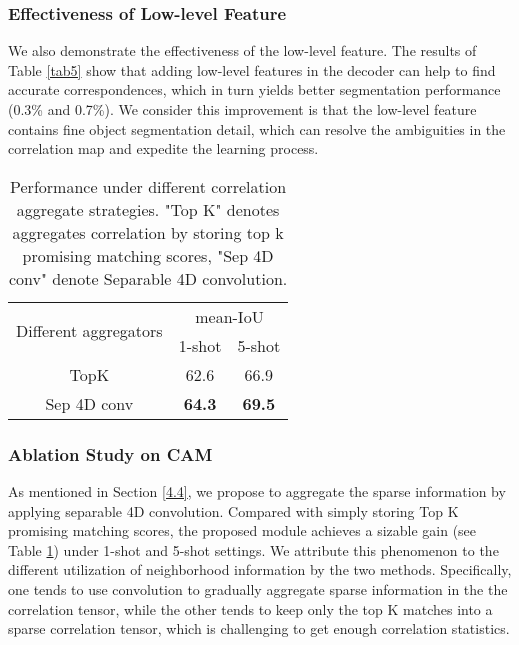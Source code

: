 \documentclass[lettersize,journal]{IEEEtran}
\begin{document}
\subsubsection{Effectiveness of Low-level Feature}
We also demonstrate the effectiveness of the low-level feature. The results of Table \ref{tab5} show that adding low-level features in the decoder can help to find accurate correspondences, which in turn yields better segmentation performance (0.3\% and 0.7\%). We consider this improvement is that the low-level feature contains fine object segmentation detail, which can resolve the ambiguities in the correlation map and expedite the learning process.

\begin{table}
\centering
\caption{Performance under different correlation aggregate strategies. "Top K" denotes aggregates correlation by storing top k promising matching scores, "Sep 4D conv" denote Separable 4D convolution. \label{tab6}}
\begin{tabular}{l|cc} 
\hline
\multirow{2}{*}{Different aggregators} & \multicolumn{2}{c}{mean-IoU}                 \\ 
\cline{2-3}
                                       & 1-shot                             & 5-shot  \\ 
\hline
\multicolumn{1}{c|}{TopK}              &62.6 & 66.9    \\
\multicolumn{1}{c|}{Sep 4D conv}       & \textbf{64.3}  & \textbf{69.5}    \\
\hline
\end{tabular}
\end{table}


\subsubsection{Ablation Study on CAM}
As mentioned in Section \ref{4.4}, we propose to aggregate the sparse information by applying separable 4D convolution. Compared with simply storing Top K promising matching scores, the proposed module achieves a sizable gain (see Table \ref{tab6}) under 1-shot and 5-shot settings. We attribute this phenomenon to the different utilization of neighborhood information by the two methods. Specifically, one tends to use convolution to gradually aggregate sparse information in the the correlation tensor, while the other tends to keep only the top K matches into a sparse correlation tensor, which is challenging to get enough correlation statistics. 
\end{document}
